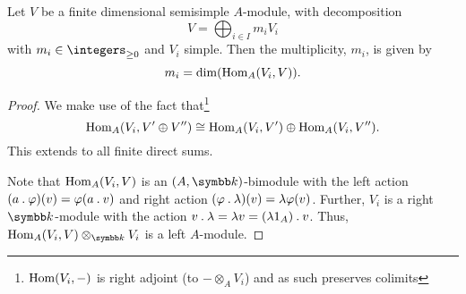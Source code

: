 \begin{lma}{}{}
    Let \(V\) be a finite dimensional semisimple \(A\)-module, with decomposition
    \begin{equation}
        V = \bigoplus_{i \in I} m_i V_i
    \end{equation}
    with \(m_i \in \integers_{\ge 0}\) and \(V_i\) simple.
    Then the multiplicity, \(m_i\), is given by
    \begin{equation}
        m_i = \dim( \operatorname{Hom}_A(V_i, V) ).
    \end{equation}
    \begin{proof}
        We make use of the fact that\footnote{\(\operatorname{Hom}(V_i, -)\) is right adjoint (to \(-\otimes_AV_i\)) and as such preserves colimits}
        \begin{equation}
            \operatorname{Hom}_A(V_i, V' \oplus V'') \cong \operatorname{Hom}_A(V_i, V') \oplus \operatorname{Hom}_A(V_i, V'').
        \end{equation}
        This extends to all finite direct sums.
        
        Note that \(\operatorname{Hom}_A(V_i, V)\) is an \((A, \field)\)-bimodule with the left action \((a \mathbin{.} \varphi)(v) = \varphi(a \mathbin{.} v)\) and right action \((\varphi \mathbin{.} \lambda)(v) = \lambda \varphi(v)\).
        Further, \(V_i\) is a right \(\field\)-module with the action \(v \mathbin{.} \lambda = \lambda v = (\lambda 1_A) \mathbin{.} v\).
        Thus, \(\Hom_A(V_i, V) \otimes_{\field} V_i\) is a left \(A\)-module.
        

\end{proof}
\end{lma}
